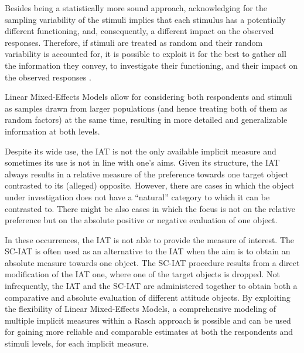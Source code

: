 \documentclass[12pt]{book}
\begin{document}
Besides being a statistically more sound approach,
acknowledging for the sampling variability of the stimuli implies that each stimulus has a potentially different functioning, and, consequently, a different impact on the observed responses.
Therefore, if stimuli are treated as random and their random variability is accounted for, it is possible to exploit it for the best to gather all the information they convey, to investigate their functioning, and their impact on the observed responses \cite{wols2017}.

Linear Mixed-Effects Models allow for considering both respondents and stimuli as samples drawn from larger populations (and hence treating both of them as random factors) at the same time, resulting in more detailed and generalizable information at both levels. 


Despite its wide use, the IAT is not the only available implicit measure and sometimes its use is not in line with one's aims. 
Given its structure, the IAT always results in a relative measure of the preference towards one target object contrasted to its (alleged) opposite. 
However, there are cases in which the object under investigation does not have a ``natural'' category to which it can be contrasted to. There might be also cases in which the focus is not on the relative preference but on the absolute positive or negative evaluation of one object. 

In these occurrences, the IAT is not able to provide the measure of interest. 
The SC-IAT \cite{karpinski2006}  is often used as an alternative to the IAT when the aim is to obtain an absolute measure towards one object. The SC-IAT procedure results from a direct modification of the IAT one, where one of the target objects is dropped. 
Not infrequently, the IAT and the SC-IAT are administered together to obtain both a comparative and absolute evaluation of different attitude objects.
By exploiting the flexibility of Linear Mixed-Effects Models, a comprehensive modeling of multiple implicit measures within a Rasch approach is possible and can be used for gaining more reliable and comparable estimates at both the respondents and stimuli levels, for each implicit measure. 
\end{document}
